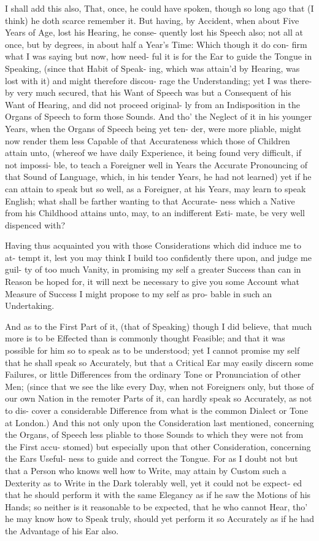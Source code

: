 I shall add this also, That, once, he could
have spoken, though so long ago that (I
think) he doth scarce remember it. But
having, by Accident, when about Five
Years of Age, lost his Hearing, he conse-
quently lost his Speech also; not all at
once, but by degrees, in about half a
Year's Time: Which though it do con-
firm what I was saying but now, how need-
ful it is for the Ear to guide the Tongue
in Speaking, (since that Habit of Speak-
ing, which was attain'd by Hearing, was
lost with it) and might therefore discou-
rage the Understanding; yet I was there-
by very much secured, that his Want of
Speech was but a Consequent of his Want
of Hearing, and did not proceed original-
ly from an Indisposition in the Organs of
Speech to form those Sounds. And tho'
the Neglect of it in his younger Years,
when the Organs of Speech being yet ten-
der, were more pliable, might now render
them less Capable of that Accurateness
which those of Children attain unto,
(whereof we have daily Experience, it
being found very difficult, if not impossi-
ble, to teach a Foreigner well in Years the
Accurate Pronouncing of that Sound of
Language, which, in his tender Years, he
had not learned) yet if he can attain to
speak but so well, as a Foreigner, at his
Years, may learn to speak English; what
shall be farther wanting to that Accurate-
ness which a Native from his Childhood
attains unto, may, to an indifferent Esti-
mate, be very well dispenced with?

Having thus acquainted you with those
Considerations which did induce me to at-
tempt it, lest you may think I build too
confidently there upon, and judge me guil-
ty of too much Vanity, in promising my
self a greater Success than can in Reason
be hoped for, it will next be necessary to
give you some Account what Measure of
Success I might propose to my self as pro-
bable in such an Undertaking.

And as to the First Part of it, (that of
Speaking) though I did believe, that much
more is to be Effected than is commonly
thought Feasible; and that it was possible
for him so to speak as to be understood;
yet I cannot promise my self that he shall
speak so Accurately, but that a Critical
Ear may easily discern some Failures, or
little Differences from the ordinary Tone
or Pronunciation of other Men; (since
that we see the like every Day, when not
Foreigners only, but those of our own
Nation in the remoter Parts of it, can
hardly speak so Accurately, as not to dis-
cover a considerable Difference from what
is the common Dialect or Tone at London.)
And this not only upon the Consideration
last mentioned, concerning the Organs, of
Speech less pliable to those Sounds to
which they were not from the First accu-
stomed) but especially upon that other
Consideration, concerning the Ears Useful-
ness to guide and correct the Tongue. For
as I doubt not but that a Person who knows
well how to Write, may attain by Custom
such a Dexterity as to Write in the Dark
tolerably well, yet it could not be expect-
ed that he should perform it with the same
Elegancy as if he saw the Motions of his
Hands; so neither is it reasonable to be
expected, that he who cannot Hear, tho'
he may know how to Speak truly, should
yet perform it so Accurately as if he had
the Advantage of his Ear also.

